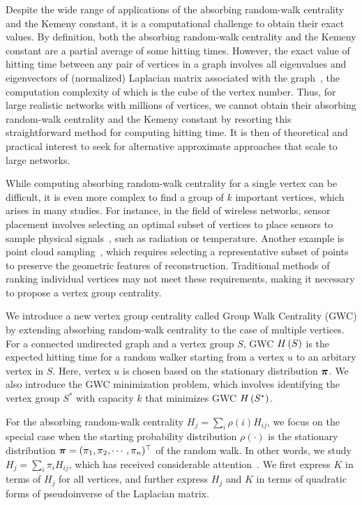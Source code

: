 \documentclass[10pt,twocolumn,twoside]{IEEEtran}
\begin{document}
Despite the wide range of applications of the absorbing random-walk centrality and the Kemeny constant, it is a computational challenge to obtain their exact values.
By definition, both the absorbing random-walk centrality and the Kemeny constant are a partial average of some hitting times.
However, the exact value of hitting time between any pair of vertices in a graph involves all eigenvalues and eigenvectors of (normalized) Laplacian matrix associated with the graph~\cite{Lo93,LiZh13PRE}, the computation complexity of which is the cube of the vertex number.
Thus, for large realistic networks with millions of vertices, we cannot obtain their absorbing random-walk centrality and the Kemeny constant by resorting this straightforward method for computing hitting time.
It is then of theoretical and practical interest to seek for alternative approximate approaches that scale to large networks.

While computing absorbing random-walk centrality for a single vertex can be difficult, it is even more complex to find a group of \(k\) important vertices, which arises in many studies.
For instance, in the field of wireless networks, sensor placement involves selecting an optimal subset of vertices to place sensors to sample physical signals~\cite{KrSiGu08,RaChVe14}, such as radiation or temperature.
Another example is point cloud sampling~\cite{DiChWaBa20,ChTiFeVeKo17}, which requires selecting a representative subset of points to preserve the geometric features of reconstruction.
Traditional methods of ranking individual vertices may not meet these requirements, making it necessary to propose a vertex group centrality.

We introduce a new vertex group centrality called Group Walk Centrality (GWC) by extending absorbing random-walk centrality to the case of multiple vertices.
For a connected undirected graph and a vertex group \(S\), GWC \(H\left(S\right)\) is the expected hitting time for a random walker starting from a vertex \(u\) to an arbitary vertex in \(S\). Here, vertex \(u\) is chosen based on the stationary distribution \(\boldsymbol{\pi}\).
We also introduce the GWC minimization problem, which involves identifying the vertex group \(S^*\) with capacity \(k\) that minimizes GWC \(H\left(S^*\right)\).

For the absorbing random-walk centrality \(H_j=\sum_{i} \rho(i) H_{ij}\), we focus on the special case when the starting probability distribution \(\rho(\cdot)\) is the stationary distribution \(\boldsymbol{\pi}=(\pi_1, \pi_2, \cdots, \pi_n)^{\top}\) of the random walk.
In other words, we study \(H_j=\sum_{i} \pi_i H_{ij}\), which has received considerable attention~\cite{TeBeVo09,Be09,Be16}.
We first express \(K\) in terms of \(H_j\) for all vertices, and further express \(H_j\) and \(K\) in terms of quadratic forms of pseudoinverse of the Laplacian matrix.
\end{document}
